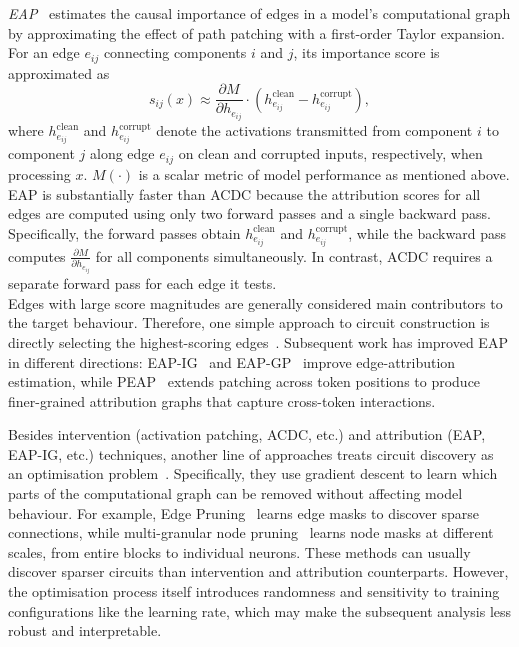 \begin{definitionbox}
\label{def:eap}
\emph{EAP}~ estimates the causal importance of edges in a model’s computational graph by approximating the effect of path patching with a first-order Taylor expansion. For an edge \(e_{ij}\) connecting components \(i\) and \(j\), its importance score is approximated as
\[
s_{ij}(x)
\approx
\frac{\partial M}{\partial h_{e_{ij}}}
\cdot
\left(h_{e_{ij}}^{\mathrm{clean}} - h_{e_{ij}}^{\mathrm{corrupt}}\right),
\]
where \(h_{e_{ij}}^{\mathrm{clean}}\) and \(h_{e_{ij}}^{\mathrm{corrupt}}\) denote the activations transmitted from component $i$ to component $j$ along edge $e_{ij}$ on clean and corrupted inputs, respectively, when processing $x$. $M(\cdot)$ is a scalar metric of model performance as mentioned above. EAP is substantially faster than ACDC because the attribution scores for all edges are computed using only two forward passes and a single backward pass. Specifically, the forward passes obtain $h_{e_{ij}}^{\mathrm{clean}}$ and $h_{e_{ij}}^{\mathrm{corrupt}}$, while the backward pass computes $\frac{\partial M}{\partial h_{e_{ij}}}$ for all components simultaneously. In contrast, ACDC requires a separate forward pass for each edge it tests.\\

Edges with large score magnitudes are generally considered main contributors to the target behaviour. Therefore, one simple approach to circuit construction is directly selecting the highest-scoring edges~. Subsequent work has improved EAP in different directions: EAP-IG~ and EAP-GP~ improve edge-attribution estimation, while PEAP~ extends patching across token positions to produce finer-grained attribution graphs that capture cross-token interactions.
\end{definitionbox}

Besides intervention (activation patching, ACDC, etc.) and attribution (EAP, EAP-IG, etc.) techniques, another line of approaches treats circuit discovery as an optimisation problem~. Specifically, they use gradient descent to learn which parts of the computational graph can be removed without affecting model behaviour. For example, Edge Pruning~ learns edge masks to discover sparse connections, while multi-granular node pruning~ learns node masks at different scales, from entire blocks to individual neurons. These methods can usually discover sparser circuits than intervention and attribution counterparts. However, the optimisation process itself introduces randomness and sensitivity to training configurations like the learning rate, which may make the subsequent analysis less robust and interpretable.


